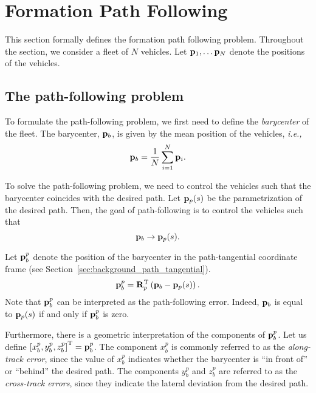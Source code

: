 \section{Formation Path Following}

This section formally defines the formation path following problem.
Throughout the section, we consider a fleet of $N$ vehicles.
Let $\mathbf{p}_1, \ldots \mathbf{p}_N$ denote the positions of the vehicles.

\subsection{The path-following problem}
To formulate the path-following problem, we first need to define the \emph{barycenter} of the fleet.
The barycenter, $\mathbf{p}_b$, is given by the mean position of the vehicles, \emph{i.e.,}
\begin{equation}
    \mathbf{p}_b = \frac{1}{N} \sum_{i=1}^N \mathbf{p}_i.
    \label{eq:background_p_b}
\end{equation}

To solve the path-following problem, we need to control the vehicles such that the barycenter coincides with the desired path.
Let $\mathbf{p}_p(s)$ be the parametrization of the desired path.
Then, the goal of path-following is to control the vehicles such that
\begin{equation}
    \mathbf{p}_b \rightarrow \mathbf{p}_p(s).
\end{equation}

Let $\mathbf{p}_b^p$ denote the position of the barycenter in the path-tangential coordinate frame (see Section~\ref{sec:background_path_tangential}).
\begin{equation}
    \mathbf{p}_b^p = \mathbf{R}_p^{\mathrm{T}} \left(\mathbf{p}_b - \mathbf{p}_p(s)\right).
\end{equation}
Note that $\mathbf{p}_b^p$ can be interpreted as the path-following error.
Indeed, $\mathbf{p}_b$ is equal to $\mathbf{p}_p(s)$ if and only if $\mathbf{p}_b^p$ is zero.

Furthermore, there is a geometric interpretation of the components of $\mathbf{p}_b^p$.
Let us define $\left[x_b^p, y_b^p, z_b^p\right]^{\mathrm{T}} = \mathbf{p}_b^p$.
The component $x_b^p$ is commonly referred to as the \emph{along-track error}, since the value of $x_b^p$ indicates whether the barycenter is ``in front of'' or ``behind'' the desired path.
The components $y_b^p$ and $z_b^p$ are referred to as the \emph{cross-track errors}, since they indicate the lateral deviation from the desired path.

